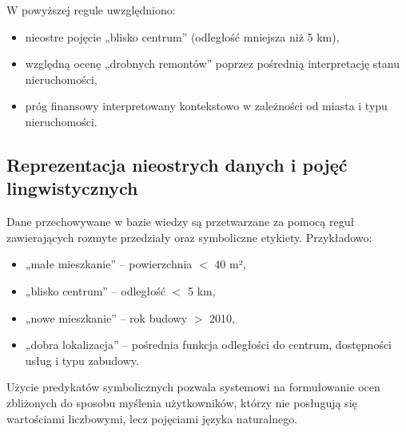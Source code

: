 W powyższej regule uwzględniono:
\begin{itemize}
    \item nieostre pojęcie „blisko centrum” (odległość mniejsza niż 5 km),
    \item względną ocenę „drobnych remontów” poprzez pośrednią interpretację stanu nieruchomości,
    \item próg finansowy interpretowany kontekstowo w zależności od miasta i typu nieruchomości.
\end{itemize}

\subsection*{Reprezentacja nieostrych danych i pojęć lingwistycznych}

Dane przechowywane w bazie wiedzy są przetwarzane za pomocą reguł zawierających rozmyte przedziały oraz symboliczne etykiety. Przykładowo:
\begin{itemize}
    \item „małe mieszkanie” – powierzchnia $<$ 40 m²,
    \item „blisko centrum” – odległość $<$ 5 km,
    \item „nowe mieszkanie” – rok budowy $>$ 2010,
    \item „dobra lokalizacja” – pośrednia funkcja odległości do centrum, dostępności usług i typu zabudowy.
\end{itemize}

Użycie predykatów symbolicznych pozwala systemowi na formułowanie ocen zbliżonych do sposobu myślenia użytkowników, którzy nie posługują się wartościami liczbowymi, lecz pojęciami języka naturalnego.
